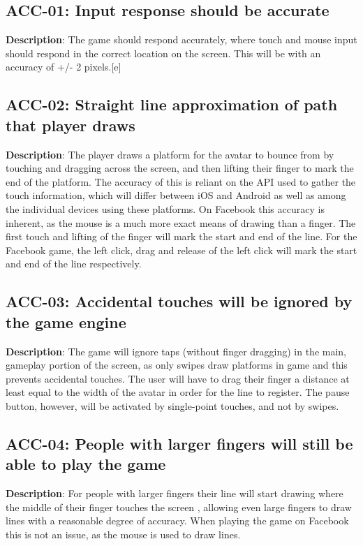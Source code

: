 \subsection{ACC-01: Input response should be accurate}
\textbf{Description}: The game should respond accurately, where touch and mouse
input should respond in the correct location on the screen. This will
be with an accuracy of +/- 2 pixels.{[}e{]}

\subsection{ACC-02: Straight line approximation of path that player draws}
\textbf{Description}: The player draws a platform for the avatar to bounce
from by touching and dragging across the screen, and then lifting
their finger to mark the end of the platform. The accuracy of this
is reliant on the API used to gather the touch information, which
will differ between iOS and Android as well as among the individual
devices using these platforms. On Facebook this accuracy is inherent,
as the mouse is a much more exact means of drawing than a finger.
The first touch and lifting of the finger will mark the start and
end of the line. For the Facebook game, the left click, drag and release
of the left click will mark the start and end of the line respectively.

\subsection{ACC-03: Accidental touches will be ignored by the game engine}
\textbf{Description}: The game will ignore taps (without finger dragging) in
the main, gameplay portion of the screen, as only swipes draw platforms
in game and this prevents accidental touches. The user will have to
drag their finger a distance at least equal to the width of the avatar
in order for the line to register. The pause button, however, will
be activated by single-point touches, and not by swipes.

\subsection{ACC-04: People with larger fingers will still be able to play the game}
\textbf{Description}: For people with larger fingers their line will start
drawing where the middle of their finger touches the screen , allowing
even large fingers to draw lines with a reasonable degree of accuracy.
When playing the game on Facebook this is not an issue, as the mouse
is used to draw lines. 


